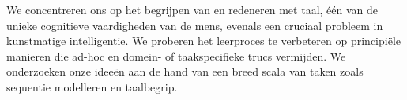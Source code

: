 We concentreren ons op het begrijpen van en redeneren met taal, \'e\'en van de unieke cognitieve vaardigheden van de mens, evenals een cruciaal probleem in kunstmatige intelligentie.
We proberen het leerproces te verbeteren op principiële manieren die ad-hoc en domein- of taakspecifieke trucs vermijden.
We onderzoeken onze ideeën aan de hand van een breed scala van taken zoals sequentie modelleren en taalbegrip.





